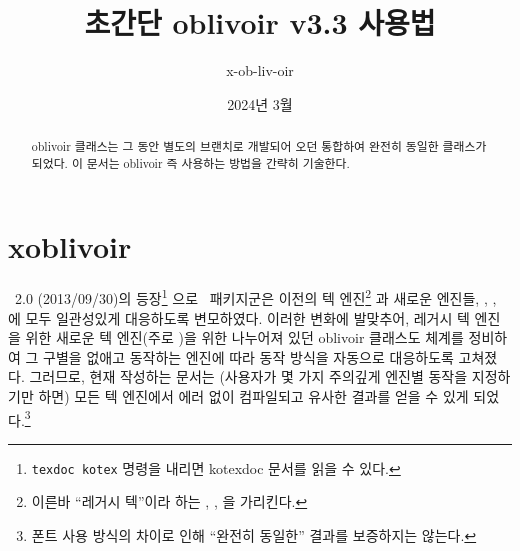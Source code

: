 \documentclass[
	12pt,
	a4paper,
	kosection,
	footnote,
	nobookmarks,
	microtype,
	figtabcapt,
]{oblivoir}
\newcommand\xobclass{x\-ob\-liv\-oir\oblivoirallowbreak}
\newcommand\obclass{ob\-liv\-oir\oblivoirallowbreak}
\begin{document}
\title{초간단 \obclass{} v3.3 사용법}

\date{2024년 3월}

\author{x-ob-liv-oir}

\maketitle

\begin{abstract}
\obclass{} 클래스는 그 동안 별도의 브랜치로 개발되어 오던
  통합하여 완전히 동일한 클래스가 되었다.
이 문서는 \obclass{} 즉 
사용하는 방법을 간략히 기술한다.
\end{abstract}

\tableofcontents*

\clearpage

\section{ \xobclass{}}


\koTeX\ 2.0 (2013/09/30)의 등장\footnote{%
	\texttt{texdoc kotex} 명령을 내리면 kotexdoc 문서를 읽을 수 있다.}%
으로 \koTeX\ 패키지군은 이전의 텍 엔진\footnote{%
	이른바 ``레거시 텍''이라 하는 , , 을
	가리킨다.}%
과 새로운 엔진들, , ,
에 모두 일관성있게 대응하도록 변모하였다.
이러한 변화에 발맞추어, 레거시 텍 엔진을 위한  새로운 텍 엔진(주로 )을 위한 
나누어져 있던 oblivoir 클래스도 체계를 정비하여 그 구별을 없애고 동작하는 엔진에 따라 동작 방식을
자동으로 대응하도록 고쳐졌다. 그러므로, 현재  작성하는 문서는 
(사용자가 몇 가지 주의깊게 엔진별 동작을 지정하기만 하면) 모든 텍 엔진에서 에러 없이 컴파일되고
유사한 결과를 얻을 수 있게 되었다.\footnote{%
	폰트 사용 방식의 차이로 인해 ``완전히 동일한'' 결과를 보증하지는 않는다.}
\end{document}
